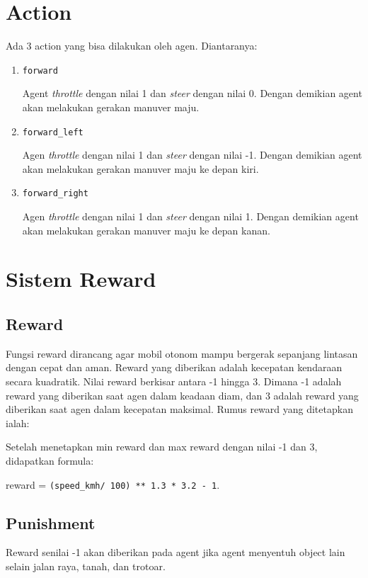 \section{Action}
\label{sec:action}
Ada 3 action yang bisa dilakukan oleh agen. Diantaranya:

\begin{enumerate}[nolistsep]
	\item \verb=forward=
	
	Agent \textit{throttle} dengan nilai 1 dan \textit{steer} dengan nilai 0. Dengan demikian agent akan melakukan gerakan manuver maju.
	
	\item \verb=forward_left=
	
	Agen \textit{throttle} dengan nilai 1 dan \textit{steer} dengan nilai -1. Dengan demikian agent akan melakukan gerakan manuver maju ke depan kiri.

	\item \verb=forward_right=
	
	Agen \textit{throttle} dengan nilai 1 dan \textit{steer} dengan nilai 1. Dengan demikian agent akan melakukan gerakan manuver maju ke depan kanan.
	
\end{enumerate}

\section{Sistem Reward}
\label{sec:sistem_reward}

\subsection{Reward}
\label{sec:reward}
Fungsi reward dirancang agar mobil otonom mampu bergerak sepanjang lintasan dengan cepat dan aman. Reward yang diberikan adalah kecepatan kendaraan secara kuadratik. Nilai reward berkisar antara -1 hingga 3. Dimana -1 adalah reward yang diberikan saat agen dalam keadaan diam, dan 3 adalah reward yang diberikan saat agen dalam kecepatan maksimal. Rumus reward yang ditetapkan ialah:



Setelah menetapkan min reward dan max reward dengan nilai -1 dan 3, didapatkan formula:

reward = \verb=(speed_kmh/ 100) ** 1.3 * 3.2 - 1=.

\subsection{Punishment}
\label{sec:punishment}
Reward senilai -1 akan diberikan pada agent jika agent menyentuh object lain selain jalan raya, tanah, dan trotoar.

